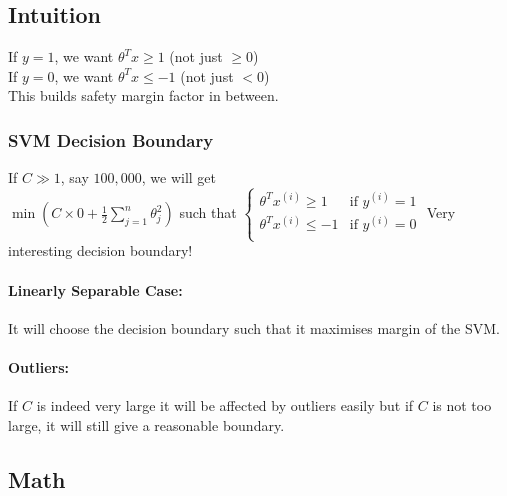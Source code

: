 \subsection{Intuition}
If $y = 1$, we want $\theta^Tx \ge 1$ (not just $\ge 0$)\\
If $y = 0$, we want $\theta^Tx \le -1$ (not just $< 0$)\\
This builds safety margin factor in between.

\subsubsection{SVM Decision Boundary}
If $C \gg 1$, say $100,000$, we will get \\
$\min \left(C \times 0 +
	\frac{1}{2}\sum_{j=1}^n\theta_j^2\right)$ such that $\begin{cases}
		\theta^Tx^{(i)} \ge 1  & \text{if } y^{(i)} = 1 \\
		\theta^Tx^{(i)} \le -1 & \text{if } y^{(i)} = 0 \\
	\end{cases}$
Very interesting decision boundary!

\paragraph{Linearly Separable Case:} It will choose the decision boundary
such that it maximises margin of the SVM.

\paragraph{Outliers:} If $C$ is indeed very large it will be affected by outliers easily
but if $C$ is not too large, it will still give a reasonable boundary.

\subsection{Math}
